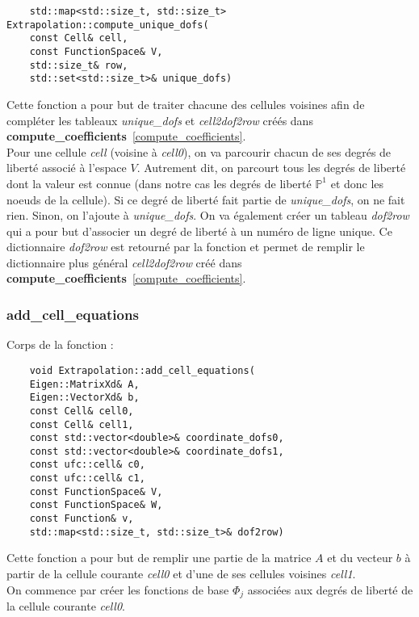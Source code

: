 \begin{lstlisting}
	std::map<std::size_t, std::size_t> Extrapolation::compute_unique_dofs(
	const Cell& cell,
	const FunctionSpace& V,
	std::size_t& row,
	std::set<std::size_t>& unique_dofs)
\end{lstlisting}

Cette fonction a pour but de traiter chacune des cellules voisines afin de compléter les tableaux \textit{unique\_dofs} et \textit{cell2dof2row} créés dans \textbf{compute\_coefficients}~\ref{compute_coefficients}.\\

Pour une cellule \textit{cell} (voisine à \textit{cell0}), on va parcourir chacun de ses degrés de liberté associé à l'espace $V$. Autrement dit, on parcourt tous les degrés de liberté dont la valeur est connue (dans notre cas les degrés de liberté $\mathbb{P}^1$ et donc les noeuds de la cellule). Si ce degré de liberté fait partie de \textit{unique\_dofs}, on ne fait rien. Sinon, on l'ajoute à \textit{unique\_dofs}. On va également créer un tableau \textit{dof2row} qui a pour but d'associer un degré de liberté à un numéro de ligne unique. Ce dictionnaire \textit{dof2row} est retourné par la fonction et permet de remplir le dictionnaire plus général \textit{cell2dof2row} créé dans \textbf{compute\_coefficients}~\ref{compute_coefficients}.

\subsubsection*{add\_cell\_equations}
\label{add_cell_equations}

Corps de la fonction :

\begin{lstlisting}
	void Extrapolation::add_cell_equations(
	Eigen::MatrixXd& A,
	Eigen::VectorXd& b,
	const Cell& cell0,
	const Cell& cell1,
	const std::vector<double>& coordinate_dofs0,
	const std::vector<double>& coordinate_dofs1,
	const ufc::cell& c0,
	const ufc::cell& c1,
	const FunctionSpace& V,
	const FunctionSpace& W,
	const Function& v,
	std::map<std::size_t, std::size_t>& dof2row)
\end{lstlisting}

Cette fonction a pour but de remplir une partie de la matrice $A$ et du vecteur $b$ à partir de la cellule courante \textit{cell0} et d'une de ses cellules voisines \textit{cell1}. \\

On commence par créer les fonctions de base $\Phi_j$ associées aux degrés de liberté de la cellule courante \textit{cell0}.

